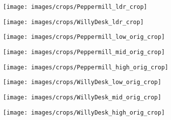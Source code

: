 \documentclass{egpubl}
\begin{document}
\begin{figure*}[htb]
    \begin{subfigure}[t]{0.40\linewidth}
        \centering
        \texttt{[image: images/crops/Peppermill\_ldr\_crop]}
    \end{subfigure}
    \begin{subfigure}[t]{0.40\linewidth}
        \centering
        \texttt{[image: images/crops/WillyDesk\_ldr\_crop]}
    \end{subfigure}

    \begin{subfigure}[t]{0.13\linewidth}
        \centering
        \texttt{[image: images/crops/Peppermill\_low\_orig\_crop]}
    \end{subfigure}
    \begin{subfigure}[t]{0.13\linewidth}
        \centering
        \texttt{[image: images/crops/Peppermill\_mid\_orig\_crop]}
    \end{subfigure}
    \begin{subfigure}[t]{0.13\linewidth}
        \centering
        \texttt{[image: images/crops/Peppermill\_high\_orig\_crop]}
    \end{subfigure}
    \begin{subfigure}[t]{0.13\linewidth}
        \centering
        \texttt{[image: images/crops/WillyDesk\_low\_orig\_crop]}
    \end{subfigure}
    \begin{subfigure}[t]{0.13\linewidth}
        \centering
        \texttt{[image: images/crops/WillyDesk\_mid\_orig\_crop]}
    \end{subfigure}
    \begin{subfigure}[t]{0.13\linewidth}
        \centering
        \texttt{[image: images/crops/WillyDesk\_high\_orig\_crop]}
    \end{subfigure}


\end{figure*}
\end{document}
